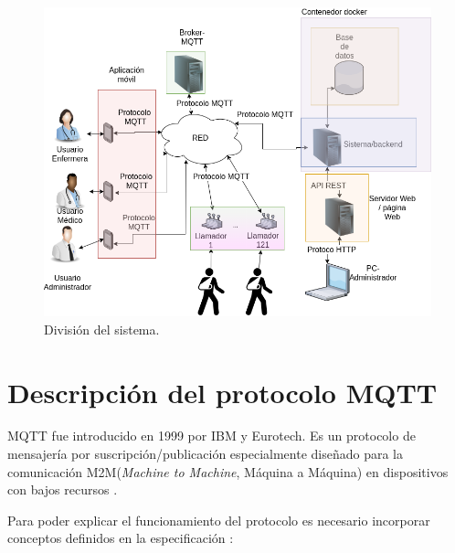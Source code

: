 \begin{figure}[ht]
	\centering
	\includegraphics[scale=.45]{./Figures/DiagramaSistemaOrganizado.png}
	\caption{División del sistema.}
	\label{fig:División del sistema}
\end{figure}



\pagebreak

\section{Descripción del protocolo MQTT}
\label{sec:Descripción del protocolo MQTT}

MQTT fue introducido en 1999 por IBM y Eurotech. Es un protocolo de mensajería por suscripción/publicación especialmente diseñado para la comunicación M2M(\textit{Machine to Machine}, Máquina a Máquina) en dispositivos con bajos recursos \citep{WEBSITE:5} .

Para poder explicar el funcionamiento del protocolo es necesario incorporar conceptos definidos en la especificación \citep{WEBSITE:5}:

